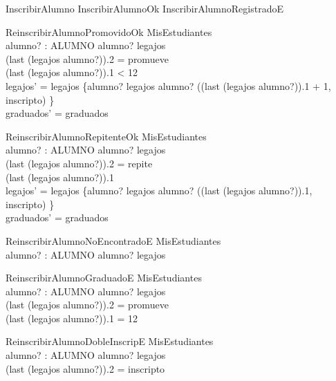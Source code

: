 \begin{zed}
    InscribirAlumno  InscribirAlumnoOk \lor InscribirAlumnoRegistradoE
\end{zed}

\begin{schema}{ReinscribirAlumnoPromovidoOk}
    \Delta MisEstudiantes \\
    alumno? : ALUMNO
    \where
    alumno? \in \dom legajos \\
    (last (legajos alumno?)).2 = promueve \\
    (last (legajos alumno?)).1 < 12 \\ 
    legajos' = legajos \oplus \{alumno? \mapsto legajos alumno? \cat \langle ((last (legajos alumno?)).1 + 1, inscripto) \rangle\} \\
    graduados' = graduados
\end{schema}

\begin{schema}{ReinscribirAlumnoRepitenteOk}
    \Delta MisEstudiantes \\
    alumno? : ALUMNO
    \where
    alumno? \in \dom legajos \\
    (last (legajos alumno?)).2 = repite \\
    (last (legajos alumno?)).1  \\ 
    legajos' = legajos \oplus \{alumno? \mapsto legajos alumno? \cat \langle ((last (legajos alumno?)).1, inscripto) \rangle\} \\
    graduados' = graduados
\end{schema}

\begin{schema}{ReinscribirAlumnoNoEncontradoE}
    \Xi MisEstudiantes \\
    alumno? : ALUMNO
    \where
    alumno? \notin \dom legajos
\end{schema}

\begin{schema}{ReinscribirAlumnoGraduadoE}
    \Xi MisEstudiantes \\
    alumno? : ALUMNO
    \where
    alumno? \in \dom legajos \\
    (last (legajos alumno?)).2 = promueve \\
    (last (legajos alumno?)).1 = 12
\end{schema}

\begin{schema}{ReinscribirAlumnoDobleInscripE}
    \Xi MisEstudiantes \\
    alumno? : ALUMNO
    \where
    alumno? \in \dom legajos \\
    (last (legajos alumno?)).2 = inscripto
\end{schema}


